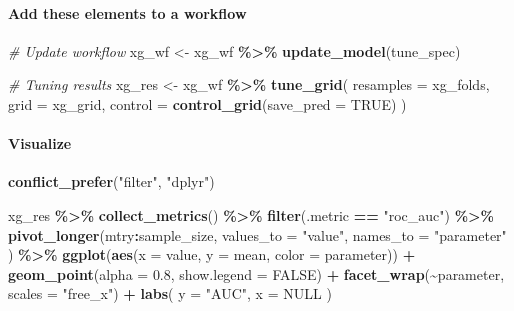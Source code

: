 \documentclass[
]{book}
\newenvironment{Shaded}{\begin{snugshade}}{\end{snugshade}}
\newcommand{\AttributeTok}[1]{\textcolor[rgb]{0.13,0.29,0.53}{#1}}
\newcommand{\CommentTok}[1]{\textcolor[rgb]{0.56,0.35,0.01}{\textit{#1}}}
\newcommand{\ConstantTok}[1]{\textcolor[rgb]{0.56,0.35,0.01}{#1}}
\newcommand{\FloatTok}[1]{\textcolor[rgb]{0.00,0.00,0.81}{#1}}
\newcommand{\FunctionTok}[1]{\textcolor[rgb]{0.13,0.29,0.53}{\textbf{#1}}}
\newcommand{\NormalTok}[1]{#1}
\newcommand{\OtherTok}[1]{\textcolor[rgb]{0.56,0.35,0.01}{#1}}
\newcommand{\SpecialCharTok}[1]{\textcolor[rgb]{0.81,0.36,0.00}{\textbf{#1}}}
\newcommand{\StringTok}[1]{\textcolor[rgb]{0.31,0.60,0.02}{#1}}
\begin{document}
\paragraph{Add these elements to a workflow}\label{add-these-elements-to-a-workflow-3}

\begin{Shaded}
\begin{Highlighting}[]
\CommentTok{\# Update workflow}
\NormalTok{xg\_wf }\OtherTok{\textless{}{-}}\NormalTok{ xg\_wf }\SpecialCharTok{\%\textgreater{}\%} \FunctionTok{update\_model}\NormalTok{(tune\_spec)}

\CommentTok{\# Tuning results}
\NormalTok{xg\_res }\OtherTok{\textless{}{-}}\NormalTok{ xg\_wf }\SpecialCharTok{\%\textgreater{}\%}
  \FunctionTok{tune\_grid}\NormalTok{(}
    \AttributeTok{resamples =}\NormalTok{ xg\_folds,}
    \AttributeTok{grid =}\NormalTok{ xg\_grid,}
    \AttributeTok{control =} \FunctionTok{control\_grid}\NormalTok{(}\AttributeTok{save\_pred =} \ConstantTok{TRUE}\NormalTok{)}
\NormalTok{  )}
\end{Highlighting}
\end{Shaded}

\paragraph{Visualize}\label{visualize-3}

\begin{Shaded}
\begin{Highlighting}[]
\FunctionTok{conflict\_prefer}\NormalTok{(}\StringTok{"filter"}\NormalTok{, }\StringTok{"dplyr"}\NormalTok{)}

\NormalTok{xg\_res }\SpecialCharTok{\%\textgreater{}\%}
  \FunctionTok{collect\_metrics}\NormalTok{() }\SpecialCharTok{\%\textgreater{}\%}
  \FunctionTok{filter}\NormalTok{(.metric }\SpecialCharTok{==} \StringTok{"roc\_auc"}\NormalTok{) }\SpecialCharTok{\%\textgreater{}\%}
  \FunctionTok{pivot\_longer}\NormalTok{(mtry}\SpecialCharTok{:}\NormalTok{sample\_size,}
    \AttributeTok{values\_to =} \StringTok{"value"}\NormalTok{,}
    \AttributeTok{names\_to =} \StringTok{"parameter"}
\NormalTok{  ) }\SpecialCharTok{\%\textgreater{}\%}
  \FunctionTok{ggplot}\NormalTok{(}\FunctionTok{aes}\NormalTok{(}\AttributeTok{x =}\NormalTok{ value, }\AttributeTok{y =}\NormalTok{ mean, }\AttributeTok{color =}\NormalTok{ parameter)) }\SpecialCharTok{+}
  \FunctionTok{geom\_point}\NormalTok{(}\AttributeTok{alpha =} \FloatTok{0.8}\NormalTok{, }\AttributeTok{show.legend =} \ConstantTok{FALSE}\NormalTok{) }\SpecialCharTok{+}
  \FunctionTok{facet\_wrap}\NormalTok{(}\SpecialCharTok{\textasciitilde{}}\NormalTok{parameter, }\AttributeTok{scales =} \StringTok{"free\_x"}\NormalTok{) }\SpecialCharTok{+}
  \FunctionTok{labs}\NormalTok{(}
    \AttributeTok{y =} \StringTok{"AUC"}\NormalTok{,}
    \AttributeTok{x =} \ConstantTok{NULL}
\NormalTok{  )}
\end{Highlighting}
\end{Shaded}
\end{document}
